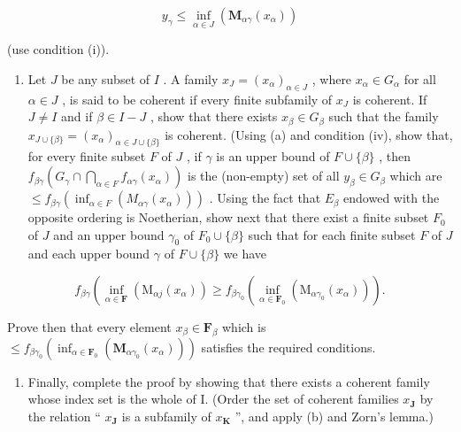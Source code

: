 \[
y _ {\gamma} \leqslant \inf _ {\alpha \in J} \left(\mathbf {M} _ {\alpha \gamma} (x _ {\alpha})\right)
\]

(use condition (i)).

\begin{enumerate}
\def\labelenumi{(\alph{enumi})}
\setcounter{enumi}{1}
\tightlist
\item
  Let \(J\) be any subset of \(I\) . A family \(x_{J} = (x_{\alpha})_{\alpha \in J}\) , where \(x_{\alpha} \in G_{\alpha}\) for all \(\alpha \in J\) , is said to be coherent if every finite subfamily of \(x_{J}\) is coherent. If \(J \neq I\) and if \(\beta \in I - J\) , show that there exists \(x_{\beta} \in G_{\beta}\) such that the family \(x_{J \cup \{\beta\}} = (x_{\alpha})_{\alpha \in J \cup \{\beta\}}\) is coherent. (Using (a) and condition (iv), show that, for every finite subset \(F\) of \(J\) , if \(\gamma\) is an upper bound of \(F \cup \{\beta\}\) , then \(f_{\beta \gamma} \left( G_{\gamma} \cap \bigcap_{\alpha \in F} f_{\alpha \gamma}(x_{\alpha}) \right)\) is the (non-empty) set of all \(y_{\beta} \in G_{\beta}\) which are \(\leqslant f_{\beta \gamma} \left( \inf_{\alpha \in F} (M_{\alpha \gamma}(x_{\alpha})) \right)\) . Using the fact that \(E_{\beta}\) endowed with the opposite ordering is Noetherian, show next that there exist a finite subset \(F_0\) of \(J\) and an upper bound \(\gamma_0\) of \(F_0 \cup \{\beta\}\) such that for each finite subset \(F\) of \(J\) and each upper bound \(\gamma\) of \(F \cup \{\beta\}\) we have
\end{enumerate}

\[
f _ {\beta \gamma} \left( \right.\inf _ {\alpha \in \mathbf {F}} \left(\mathrm{M} _ {\alpha j} (x _ {\alpha})\right) \geqslant f _ {\beta \gamma_ {0}} \left(\inf _ {\alpha \in \mathbf {F} _ {0}} \left(\mathrm{M} _ {\alpha \gamma_ {0}} (x _ {\alpha})\right)\right).
\]

Prove then that every element \(x_{\beta} \in \mathbf{F}_{\beta}\) which is \(\leqslant f_{\beta \gamma_0} \left( \inf_{\alpha \in \mathbf{F}_0} (\mathbf{M}_{\alpha \gamma_0}(x_\alpha)) \right)\) satisfies the required conditions.

\begin{enumerate}
\def\labelenumi{(\alph{enumi})}
\setcounter{enumi}{2}
\tightlist
\item
  Finally, complete the proof by showing that there exists a coherent family whose index set is the whole of I. (Order the set of coherent families \(x_{\mathbf{J}}\) by the relation `` \(x_{\mathbf{J}}\) is a subfamily of \(x_{\mathbf{K}}\) '', and apply (b) and Zorn's lemma.)
\end{enumerate}

